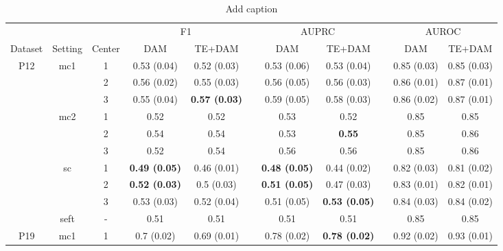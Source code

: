 \documentclass[journal,twoside,web]{ieeecolor}
\begin{document}
\begin{table}[htbp]
    \centering
    \caption{Add caption}
      \begin{tabular}{ccccccccccc}
      \toprule
      \toprule
            &       &       & \multicolumn{2}{c}{F1} &       & \multicolumn{2}{c}{AUPRC} &       & \multicolumn{2}{c}{AUROC} \\
  \cmidrule{4-5}\cmidrule{7-8}\cmidrule{10-11}    Dataset & Setting & Center & DAM   & TE+DAM &       & DAM   & TE+DAM &       & DAM   & TE+DAM \\
      \midrule
      \multirow{10}[8]{*}{P12} & \multirow{3}[2]{*}{mc1} & 1     & 0.53 (0.04) & 0.52 (0.03) &       & 0.53 (0.06) & 0.53 (0.04) &       & 0.85 (0.03) & 0.85 (0.03) \\
            &       & 2     & 0.56 (0.02) & 0.55 (0.03) &       & 0.56 (0.05) & 0.56 (0.03) &       & 0.86 (0.01) & 0.87 (0.01) \\
            &       & 3     & 0.55 (0.04) & \textbf{0.57 (0.03)} &       & 0.59 (0.05) & 0.58 (0.03) &       & 0.86 (0.02) & 0.87 (0.01) \\
  \cmidrule{2-11}          & \multirow{3}[2]{*}{mc2} & 1     & 0.52  & 0.52  &       & 0.53  & 0.52  &       & 0.85  & 0.85 \\
            &       & 2     & 0.54  & 0.54  &       & 0.53  & \textbf{0.55} &       & 0.85  & 0.86 \\
            &       & 3     & 0.52  & 0.54  &       & 0.56  & 0.56  &       & 0.85  & 0.86 \\
  \cmidrule{2-11}          & \multirow{3}[2]{*}{sc} & 1     & \textbf{0.49 (0.05)} & 0.46 (0.01) &       & \textbf{0.48 (0.05)} & 0.44 (0.02) &       & 0.82 (0.03) & 0.81 (0.02) \\
            &       & 2     & \textbf{0.52 (0.03)} & 0.5 (0.03) &       & \textbf{0.51 (0.05)} & 0.47 (0.03) &       & 0.83 (0.01) & 0.82 (0.01) \\
            &       & 3     & 0.53 (0.03) & 0.52 (0.04) &       & 0.51 (0.05) & \textbf{0.53 (0.05)} &       & 0.84 (0.03) & 0.84 (0.02) \\
  \cmidrule{2-11}          & seft  & -     & 0.51  & 0.51  &       & 0.51  & 0.51  &       & 0.85  & 0.85 \\
      \midrule
      \multirow{6}[6]{*}{P19} & \multirow{2}[2]{*}{mc1} & 1     & 0.7 (0.02) & 0.69 (0.01) &       & 0.78 (0.02) & \textbf{0.78 (0.02)} &       & 0.92 (0.02) & 0.93 (0.01) \\

\end{tabular}
\end{table}
\end{document}
